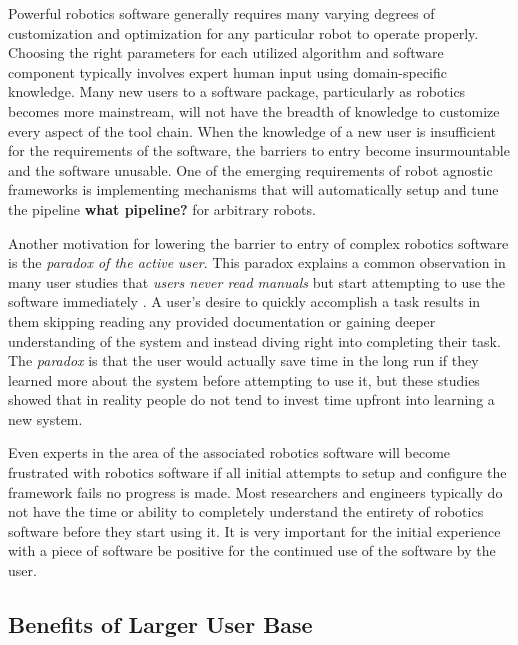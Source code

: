 \documentclass[10pt,journal,compsoc]{joser1}
\begin{document}
{Powerful robotics software generally requires many varying degrees of customization and optimization for any particular robot to operate properly. Choosing the right parameters for each utilized algorithm and software component typically involves expert human input using domain-specific knowledge. Many new users to a software package, particularly as robotics becomes more mainstream, will not have the breadth of knowledge to customize every aspect of the tool chain. When the knowledge of a new user is insufficient for the requirements of the software, the barriers to entry become insurmountable and the software unusable. One of the emerging requirements of robot agnostic frameworks is implementing mechanisms that will automatically setup and tune the pipeline \textbf{what pipeline?} for arbitrary robots.

Another motivation for lowering the barrier to entry of complex robotics software is the \textit{paradox of the active user}. This paradox explains a common observation in many user studies that \textit{users never read manuals} but start attempting to use the software immediately \cite{carroll1987interfacing}. A user's desire to quickly accomplish a task results in them skipping reading any provided documentation or gaining deeper understanding of the system and instead diving right into completing their task. The \textit{paradox} is that the user would actually save time in the long run if they learned more about the system before attempting to use it, but these studies showed that in reality people do not tend to invest time upfront into learning a new system.

Even experts in the area of the associated robotics software will become frustrated with robotics software if all initial attempts to setup and configure the framework fails \textand no progress is made. Most researchers and engineers typically do not have the time or ability to completely understand the entirety of robotics software before they start using it. It is very important for the initial experience with a piece of software be positive for the continued use of the software by the user.

\subsection{Benefits of Larger User Base}

}
\end{document}
